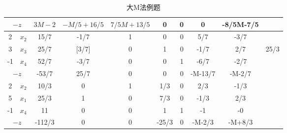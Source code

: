 \documentclass{book}
\begin{document}
\begin{table}[ht]
\begin{tabular}{c|c|c|cccccc|c}
        \hline
        \multicolumn{2}{c|}{$-z$}           & $3M-2$                              & $-M/5+16/5$                       & $7/5M+13/5$ & 0      & 0     & 0       & -8/5M-7/5 &                                                \\
        \hline
        2                                   & $x_2$                               & 15/7                              & -1/7        & 1      & 0     & 0       & 5/7       & -3/7  &                                        \\
        3                                   & $x_3$                               & 25/7                              & [3/7]       & 0      & 1     & 0       & -1/7      & 2/7   & 25/3                                   \\
        -1                                  & $x_4$                               & 52/7                              & -3/7        & 0      & 0     & 1       & -6/7      & -2/7  &                                        \\
        \hline
        \multicolumn{2}{c|}{$-z$}           & -53/7                               & 25/7                              & 0           & 0      & 0     & -M-13/7 & -M-2/7    &                                                \\
        \hline
        2                                   & $x_2$                               & 10/3                              & 0           & 1      & 1/3   & 0       & 2/3       & -1/3  &                                        \\
        5                                   & $x_1$                               & 25/3                              & 1           & 0      & 7/3   & 0       & -1/3      & 2/3   &                                        \\
        -1                                  & $x_4$                               & 11                                & 0           & 0      & 1     & 1       & -1        & -0    &                                        \\
        \hline
        \multicolumn{2}{c|}{$-z$}           & -112/3                              & 0                                 & 0           & -25/3  & 0     & -M-2/3  & -M+8/3    &                                                \\
        \hline
    \end{tabular}
    \caption{大M法例题}
    \label{tab:example de big M method}
\end{table}
\end{document}
